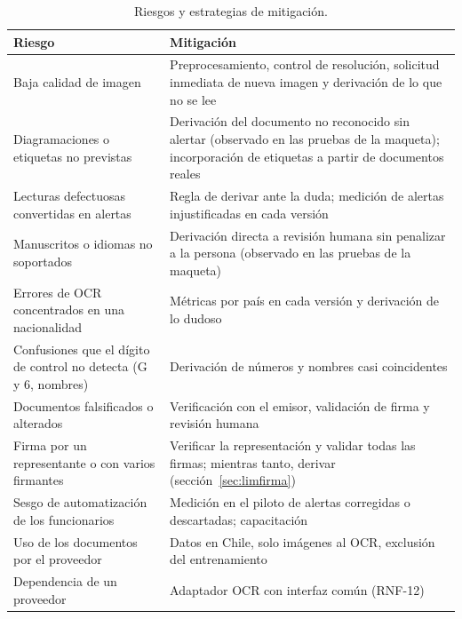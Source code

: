 \documentclass[11pt,a4paper]{article}
\begin{document}
\begin{table}[!htbp]
\centering
\caption{Riesgos y estrategias de mitigación.}
\label{tab:riesgos}
\small
\begin{tabularx}{\textwidth}{>{\raggedright\arraybackslash}p{5cm} L}
\toprule
\textbf{Riesgo} & \textbf{Mitigación} \\
\midrule
Baja calidad de imagen & Preprocesamiento, control de resolución, solicitud inmediata de nueva imagen y derivación de lo que no se lee \\
Diagramaciones o etiquetas no previstas & Derivación del documento no reconocido sin alertar (observado en las pruebas de la maqueta); incorporación de etiquetas a partir de documentos reales \\
Lecturas defectuosas convertidas en alertas & Regla de derivar ante la duda; medición de alertas injustificadas en cada versión \\
Manuscritos o idiomas no soportados & Derivación directa a revisión humana sin penalizar a la persona (observado en las pruebas de la maqueta) \\
Errores de OCR concentrados en una nacionalidad & Métricas por país en cada versión y derivación de lo dudoso \\
Confusiones que el dígito de control no detecta (G y 6, nombres) & Derivación de números y nombres casi coincidentes \\
Documentos falsificados o alterados & Verificación con el emisor, validación de firma y revisión humana \\
Firma por un representante o con varios firmantes & Verificar la representación y validar todas las firmas; mientras tanto, derivar (sección~\ref{sec:limfirma}) \\
Sesgo de automatización de los funcionarios & Medición en el piloto de alertas corregidas o descartadas; capacitación \\
Uso de los documentos por el proveedor & Datos en Chile, solo imágenes al OCR, exclusión del entrenamiento \\
Dependencia de un proveedor & Adaptador OCR con interfaz común (RNF-12) \\
\bottomrule
\end{tabularx}
\end{table}
\end{document}
